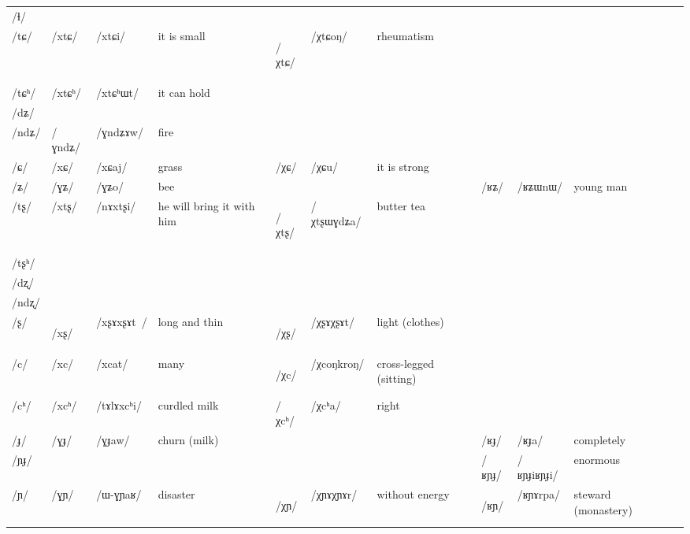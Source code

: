 \documentclass[oneside,a4paper,11pt]{article}
\newcommand{\ipa}[1]{\mbox{\phon/#1/}}
\newcommand{\deux}[1]{\ipa{#1}\addtocounter{2clusters}{1}}
\newcommand{\tib}[1]{\cellcolor{lightgray}\textbf{#1}}
\newcommand{\idph}[1]{\cellcolor{gray}\textbf{#1}}
\newcommand{\resetcounters}[2]{
\newcounter{#1}
\newcounter{#2}
 \setcounter{#1}{\value{2clusters}}
  \setcounter{#2}{\value{3clusters}}
 \setcounter{2clusters}{0}
  \setcounter{3clusters}{0}
}
\begin{document}
\begin{table}
{\begin{tabular}{l|lll|lll|lll|l}
\ipa{ɬ} 	& 	  	& 	  	& 	  	& 	  	& 	  	& 	& 	  	& 	  	& 	 \\  
\ipa{tɕ}	& 	 \deux{xtɕ}	& 	 \ipa{xtɕi}	& 	 it is small 	& 	 \deux{χtɕ}  \tib{} 	& 	 \ipa{χtɕoŋ}	& 	rheumatism	&	&	& \\  	
\ipa{tɕʰ}	& 	 \deux{xtɕʰ}	& 	 \ipa{xtɕʰɯt}	& 	it can hold	& 	  	& 	  	& 	&	&	& \\  		
\ipa{dʑ} 	& 	  	& 	  	& 	  	& 	  	& 	  	& 	& 	  	& 	  	& 	 \\  
\ipa{ndʑ}	& 	 \deux{ɣndʑ}	& 	 \ipa{ɣndʑɤw}	& 	fire	& 	  	& 	  	& 	&	&	&	 \\  	
\ipa{ɕ}	& 	 \deux{xɕ}	& 	 \ipa{xɕaj}	& 	grass	& 	 \deux{χɕ}	& 	 \ipa{χɕu}	& 	it is strong 	&	&	&\\  	
\ipa{ʑ}	& 	 \deux{ɣʑ}	& 	 \ipa{ɣʑo}	& 	bee	& 	&	&	& \ipa{ʁʑ}	&	 \ipa{ʁʑɯnɯ}	& 	young man \\  		
\ipa{tʂ}	& 	 \deux{xtʂ}	& 	 \ipa{nɤxtʂi}	& 	 he will bring it with him 	& 	 \deux{χtʂ}  \tib{}	& 	 \ipa{χtʂɯɣdʑa}	& 	butter tea 	&	&	&\\  	
\ipa{tʂʰ}	& 	  	& 	  	& 	  	& 	  	& 	  	& 	&	&	&	 \\  	
\ipa{dʐ}	& 	  	& 	  	& 	  	& 	  	& 	  	& 	&	&	&	 \\  	
\ipa{ndʐ}	& 	  	& 	  	& 	  	& 	  	& 	  	& 	&	&	&	 \\  	
\ipa{ʂ}	& 	 \deux{xʂ} \idph{}	& 	 \ipa{xʂɤxʂɤt }	& 	long and thin	& 	 \deux{χʂ} \idph{}	& 	 \ipa{χʂɤχʂɤt}	& 	light (clothes)	&	&	& \\  	
\ipa{c}	& 	 \deux{xc}	& 	 \ipa{xcat}	& 	many	& 	 \deux{χc} \tib{}	& 	 \ipa{χcoŋkroŋ}	& 	 cross-legged (sitting) 	&	&	&\\  	
\ipa{cʰ}	& 	 \deux{xcʰ}	& 	 \ipa{tɤlɤxcʰi}	& 	curdled milk	& 	 \deux{χcʰ}	& 	 \ipa{χcʰa}	& 	 right 	&	&	&\\  	
\ipa{ɟ}	& 	 \deux{ɣɟ}	& 	 \ipa{ɣɟaw}	& 	 churn (milk) 	& 	&	&	&	 \deux{ʁɟ}	& 	  \ipa{ʁɟa}	& 	completely  \\  	
\ipa{ɲɟ}	&  	& 	 	& 	 	& 	&	&	&	 \deux{ʁɲɟ}	& 	  \ipa{ʁɲɟiʁɲɟi}	& 	enormous  \\  	
\ipa{ɲ}	& 	 \deux{ɣɲ}	& 	 \ipa{ɯ-ɣɲaʁ}	& 	 disaster 	& 	\deux{χɲ} \idph{}	& \ipa{χɲɤχɲɤr}	& without energy 	& \deux{ʁɲ}\tib{}	& 	 \ipa{ʁɲɤrpa}	& 	steward (monastery) \\  	
\bottomrule
\end{tabular}}
\end{table}
 \resetcounters{2xgC}{3xgC} %
\end{document}
